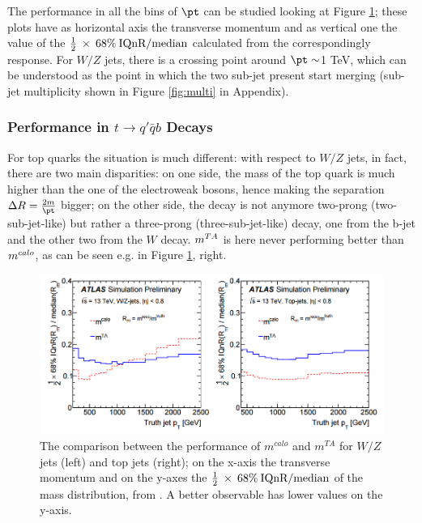 The performance in all the bins of $\pt$ can be studied looking at Figure \ref{fig:mta3}; these plots have as horizontal axis the transverse momentum and as vertical one the value of the $\frac{1}{2}\: \times\: 68\% \:\textrm{IQnR/median}$ calculated from the correspondingly response. For $W/Z$ jets, there is a crossing point around $\pt\sim$1 TeV, which can be understood as the point in which the two sub-jet present start merging (sub-jet multiplicity shown in Figure \ref{fig:multi} in Appendix).



\subsubsection{Performance in $t\to q'\bar{q}b$ Decays}

For top quarks the situation is much different: with respect to $W/Z$ jets, in fact, there are two main disparities: on one side, the mass of the top quark is much higher than the one of the electroweak bosons, hence making the separation $\Delta R=\frac{2m}{\pt}$ bigger; on the other side, the decay is not anymore two-prong (two-sub-jet-like) but rather a three-prong  (three-sub-jet-like) decay, one from the b-jet and the other two from the $W$ decay.
$m^{TA}$ is here never performing better than $m^{calo}$, as can be seen e.g. in Figure \ref{fig:mta3}, right.


\begin{figure}[!ht]
  \centering
      \includegraphics[width=\textwidth]{jet_part/mtawandtop.png}
  \caption[$m^{calo}$ and $m^{TA}$ comparison for $W/Z$ jets and top jets]{The comparison between the performance of $m^{calo}$ and $m^{TA}$ for $W/Z$ jets (left) and top jets (right); on the x-axis the transverse momentum and on the y-axes the $\frac{1}{2}\: \times\: 68\% \:\textrm{IQnR/median}$ of the mass distribution, from \cite{art35}. A better observable has lower values on the y-axis. }
  \label{fig:mta3}
\end{figure}

